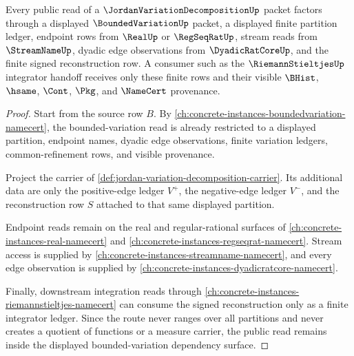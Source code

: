 \begin{theorem}
\label{thm:jordan-variation-decomposition-bounded-variation-route}
Every public read of a $\JordanVariationDecompositionUp$ packet factors through a displayed $\BoundedVariationUp$ packet, a displayed finite partition ledger, endpoint rows from $\RealUp$ or $\RegSeqRatUp$, stream reads from $\StreamNameUp$, dyadic edge observations from $\DyadicRatCoreUp$, and the finite signed reconstruction row. A consumer such as the $\RiemannStieltjesUp$ integrator handoff receives only these finite rows and their visible $\BHist$, $\hsame$, $\Cont$, $\Pkg$, and $\NameCert$ provenance.
\end{theorem}
\begin{proof}
Start from the source row $B$. By \autoref{ch:concrete-instances-boundedvariation-namecert}, the bounded-variation read is already restricted to a displayed partition, endpoint names, dyadic edge observations, finite variation ledgers, common-refinement rows, and visible provenance.

Project the carrier of \autoref{def:jordan-variation-decomposition-carrier}. Its additional data are only the positive-edge ledger $V^{+}$, the negative-edge ledger $V^{-}$, and the reconstruction row $S$ attached to that same displayed partition.

Endpoint reads remain on the real and regular-rational surfaces of \autoref{ch:concrete-instances-real-namecert} and \autoref{ch:concrete-instances-regseqrat-namecert}. Stream access is supplied by \autoref{ch:concrete-instances-streamname-namecert}, and every edge observation is supplied by \autoref{ch:concrete-instances-dyadicratcore-namecert}.

Finally, downstream integration reads through \autoref{ch:concrete-instances-riemannstieltjes-namecert} can consume the signed reconstruction only as a finite integrator ledger. Since the route never ranges over all partitions and never creates a quotient of functions or a measure carrier, the public read remains inside the displayed bounded-variation dependency surface.
\end{proof}


